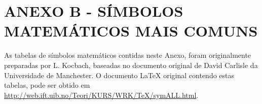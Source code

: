 \renewcommand{\thechapter}{}%
\chapter{ANEXO B - SÍMBOLOS MATEMÁTICOS MAIS COMUNS} %
\label{anexoB} %
\renewcommand{\thechapter}{B}%

As tabelas de símbolos matemáticos contidas neste Anexo, foram originalmente preparadas por L. Kocbach, baseadas no documento original de David Carlisle da Universidade de Manchester. O documento LaTeX original contendo estas tabelas, pode ser obtido em \url{http://web.ift.uib.no/Teori/KURS/WRK/TeX/symALL.html}.


\def\W#1#2{$#1{#2}$ &\tt\string#1\string{#2\string}}
\def\X#1{$#1$ &\tt\string#1}
\def\Y#1{$\big#1$ &\tt\string#1}
\def\Z#1{\tt\string#1}



